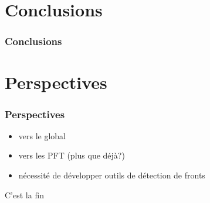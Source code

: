 \section{Conclusions}

\begin{frame}
  \frametitle{Conclusions}

\end{frame}

\section{Perspectives}
\begin{frame}
  \frametitle{Perspectives}

  \begin{itemize}
    \item vers le global
    \item vers les PFT (plus que déjà?)
    \item nécessité de développer outils de détection de fronts
  \end{itemize}

\end{frame}


\begin{frame}
  C'est la fin
\end{frame}


